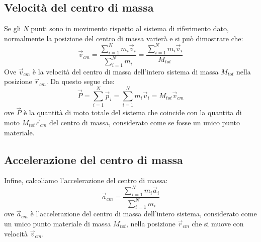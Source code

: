\documentclass[12pt]{report}
\begin{document}
	\subsection{Velocità del centro di massa}
	Se gli \textit{N} punti sono in movimento rispetto al sistema di riferimento dato, normalmente la posizione del centro di massa varierà e si può dimostrare che:
	\[
	\vec{v}_{cm}=  \dfrac{\sum_{i=1}^{N}m_i\vec{v}_i}{\sum_{i=1}^{N}m_i} = \dfrac{\sum_{i=1}^{N}m_i\vec{v}_i}{M_{tot}}
	\]
	Ove $\vec{v}_{cm}$ è la velocità del centro di massa dell'intero sistema di massa $M_{tot}$ nella posizione $\vec{r}_{cm}$. Da questo segue che:
	\[
	\vec{P} = \sum_{i=1}^{N}\vec{p}_i = \sum_{i=1}^{N}m_i\vec{v}_i = M_{tot}\vec{v}_{cm}
	\]
	ove $\vec{P}$ è la quantità di moto totale del sistema che coincide con la quantita di moto $M_{tot}\vec{c}_{cm}$ del centro di massa, considerato come se fosse un unico punto materiale.
	\subsection{Accelerazione del centro di massa}
	Infine, calcoliamo l'accelerazione del centro di massa:
	\[
	\vec{a}_{cm} = \dfrac{\sum_{i=1}^{N}m_i\vec{a}_i}{\sum_{i=1}^{N}m_i}
	\]
	ove $\vec{a}_{cm}$ è l'accelerazione del centro di massa dell'intero sistema, considerato come un unico punto materiale di massa $M_{tot}$, nella posizione $\vec{r}_{cm}$ che si muove con velocità $\vec{v}_{cm}$.
\end{document}
